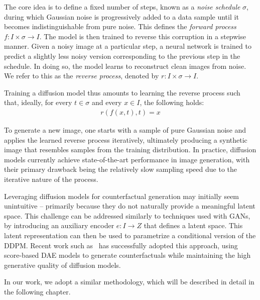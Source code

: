The core idea is to define a fixed number of steps, known as a \emph{noise schedule} $\sigma$, during which Gaussian noise is progressively added to a data sample until it becomes indistinguishable from pure noise. This defines the \emph{forward process} $f : I \times \sigma \to I$. The model is then trained to reverse this corruption in a stepwise manner. Given a noisy image at a particular step, a neural network is trained to predict a slightly less noisy version corresponding to the previous step in the schedule. In doing so, the model learns to reconstruct clean images from noise. We refer to this as the \emph{reverse process}, denoted by $r : I \times \sigma \to I$.

Training a diffusion model thus amounts to learning the reverse process such that, ideally, for every $t \in \sigma$ and every $x \in I$, the following holds:
\begin{align*}
    r(f(x, t), t) = x
\end{align*}

To generate a new image, one starts with a sample of pure Gaussian noise and applies the learned reverse process iteratively, ultimately producing a synthetic image that resembles samples from the training distribution. In practice, diffusion models currently achieve state-of-the-art performance in image generation, with their primary drawback being the relatively slow sampling speed due to the iterative nature of the process.

Leveraging diffusion models for counterfactual generation may initially seem unintuitive -- primarily because they do not naturally provide a meaningful latent space. This challenge can be addressed similarly to techniques used with GANs, by introducing an auxiliary encoder $e : I \to Z$ that defines a latent space. This latent representation can then be used to parametrize a conditional version of the DDPM. Recent work such as~\cite{atad2024counterfactual,vzigutyte2025counterfactual} has successfully adopted this approach, using score-based DAE models to generate counterfactuals while maintaining the high generative quality of diffusion models.

In our work, we adopt a similar methodology, which will be described in detail in the following chapter.